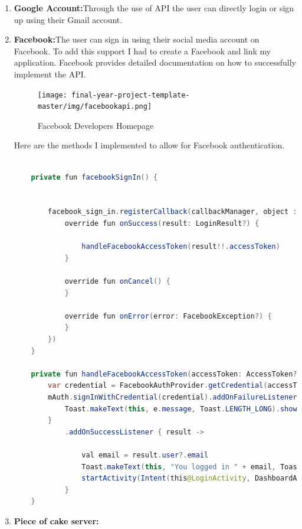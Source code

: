 \begin{enumerate}
  \item \textbf{Google Account:}Through the use of API the user can directly login or sign up using their Gmail account.
  \item \textbf{Facebook:}The user can sign in using their social media account on Facebook. To add this support I had to create a Facebook and link my application. Facebook provides detailed documentation on how to successfully implement the API.
  
  \begin{figure}[H]
  \centering
    \texttt{[image: final-year-project-template-master/img/facebookapi.png]}
     \caption{Facebook Developers Homepage}
\end{figure}



Here are the methods I implemented to allow for Facebook authentication.

\begin{lstlisting}[language=Java, caption=Facebook Login /Sign up ]

    private fun facebookSignIn() {


        facebook_sign_in.registerCallback(callbackManager, object : FacebookCallback<LoginResult> {
            override fun onSuccess(result: LoginResult?) {

                handleFacebookAccessToken(result!!.accessToken)
            }

            override fun onCancel() {
            }

            override fun onError(error: FacebookException?) {
            }
        })
    }

    private fun handleFacebookAccessToken(accessToken: AccessToken?) {
        var credential = FacebookAuthProvider.getCredential(accessToken!!.token)
        mAuth.signInWithCredential(credential).addOnFailureListener { e ->
            Toast.makeText(this, e.message, Toast.LENGTH_LONG).show()
        }
            .addOnSuccessListener { result ->

                val email = result.user?.email
                Toast.makeText(this, "You logged in " + email, Toast.LENGTH_LONG).show()
                startActivity(Intent(this@LoginActivity, DashboardActivity::class.java))
            }
    }
\end{lstlisting}


  \item \textbf{Piece of cake server:}

\end{enumerate}


